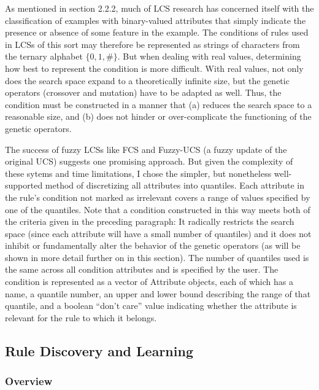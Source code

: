\documentclass[12pt,twoside]{article}
\begin{document}
As mentioned in section 2.2.2, much of LCS research has concerned itself with the classification of examples with binary-valued attributes that simply indicate the presence or absence of some feature in the example. The conditions of rules used in LCSs of this sort may therefore be represented as strings of characters from the ternary alphabet $\{0,1,\#\}$. But when dealing with real values, determining how best to represent the condition is more difficult. With real values, not only does the search space expand to a theoretically infinite size, but the genetic operators (crossover and mutation) have to be adapted as well. Thus, the condition must be constructed in a manner that (a) reduces the search space to a reasonable size, and (b) does not hinder or over-complicate the functioning of the genetic operators.

The success of fuzzy LCSs like FCS \cite{manuel_valenzuela-rendon_fuzzy_1991} and Fuzzy-UCS \cite{orriols-puig_fuzzy-ucs:_2009} (a fuzzy update of the original UCS) suggests one promising approach. But given the complexity of these sytems and time limitations, I chose the simpler, but nonetheless well-supported method of discretizing all attributes into quantiles. Each attribute in the rule's condition not marked as irrelevant covers a range of values specified by one of the quantiles. Note that a condition constructed in this way meets both of the criteria given in the preceding paragraph: It radically restricts the search space (since each attribute will have a small number of quantiles) and it does not inhibit or fundamentally alter the behavior of the genetic operators (as will be shown in more detail further on in this section). The number of quantiles used is the same across all condition attributes and is specified by the user. The condition is represented as a vector of Attribute objects, each of which has a name, a quantile number, an upper and lower bound describing the range of that quantile, and a boolean ``don't care'' value indicating whether the attribute is relevant for the rule to which it belongs.

\subsection{Rule Discovery and Learning}

\subsubsection{Overview}
\end{document}

